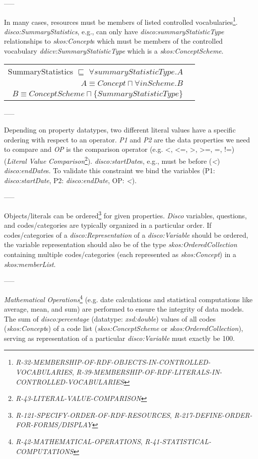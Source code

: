 \documentclass{llncs}
\newenvironment{DL}{
  \vspace{0cm}
  \begin{tabular}{r l}

}{
  \end{tabular}
}
\begin{document}
-----

In many cases, resources must be members of listed controlled vocabularies\footnote{\emph{R-32-MEMBERSHIP-OF-RDF-OBJECTS-IN-CONTROLLED-VOCABULARIES}, 
\emph{R-39-MEMBERSHIP-OF-RDF-LITERALS-IN-CONTROLLED-VOCABULARIES}}.
\emph{disco:SummaryStatistics}, e.g., can only have \emph{disco:summaryStatisticType} relationships to \emph{skos:Concept}s which must be members of the controlled vocabulary \emph{ddicv:SummaryStatisticType} which is a \emph{skos:ConceptScheme}.

\begin{DL}
SummaryStatistics $\sqsubseteq$ $\forall summaryStatisticType.A$ \\
$A \equiv Concept \sqcap \forall inScheme . B$ \\
$B \equiv ConceptScheme \sqcap \{SummaryStatisticType\}$
\end{DL}

-----

Depending on property datatypes,
two different literal values have
a specific ordering with respect to an operator. 
\emph{P1} and \emph{P2} are the data properties we need to compare and 
\emph{OP} is the comparison operator (e.g. \textless, \textless=, \textgreater, \textgreater=, =, !=) (\emph{Literal Value Comparison}\footnote{\emph{R-43-LITERAL-VALUE-COMPARISON}}).
\emph{disco:startDate}s, e.g., must be before (\emph{\textless}) \emph{disco:endDate}s.
To validate this constraint we bind the variables (P1: \emph{disco:startDate}, P2: \emph{disco:endDate}, OP: \emph{\textless}).

-----

Objects/literals can be ordered\footnote{\emph{R-121-SPECIFY-ORDER-OF-RDF-RESOURCES}, \emph{R-217-DEFINE-ORDER-FOR-FORMS/DISPLAY}} for given properties.
\emph{Disco }variables, questions, and codes/categories are typically organized in a particular order. 
If codes/categories of a \emph{disco:Representation} of a \emph{disco:Variable} should be ordered, the variable representation should also be of the type \emph{skos:OrderedCollection} containing multiple codes/categories (each represented as \emph{skos:Concept}) in a \emph{skos:memberList}. 

-----

{\em Mathematical Operations}\footnote{{\em R-42-MATHEMATICAL-OPERATIONS}, {\em R-41-STATISTICAL-COMPUTATIONS}} (e.g. date calculations and statistical computations like average, mean, and sum) are performed to ensure the integrity of data models.
The sum of {\em disco:percentage} (datatype: {\em xsd:double}) values of all codes ({\em skos:Concept}s) of a code list ({\em skos:ConceptScheme} or {\em skos:OrderedCollection}), serving as representation of a particular {\em disco:Variable} must exactly be 100.
\end{document}
